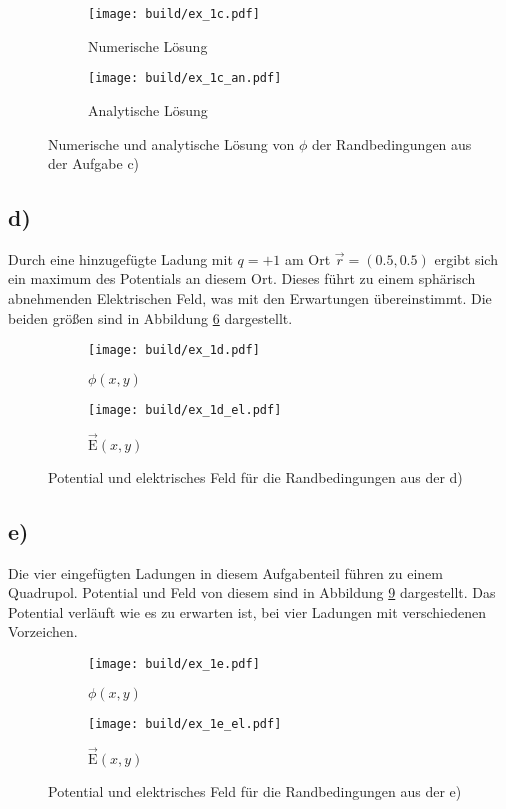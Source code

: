 \begin{figure}
    \begin{subfigure}{0.48\textwidth}
        \centering
        \texttt{[image: build/ex\_1c.pdf]}
        \caption{Numerische Lösung}
        \label{fig:1c}
    \end{subfigure}
    \hfill
    \begin{subfigure}{0.48\textwidth}
        \centering
        \texttt{[image: build/ex\_1c\_an.pdf]}
        \caption{Analytische Lösung}
        \label{fig:1ce}
    \end{subfigure}
    \caption{Numerische und analytische Lösung von $\phi$ der Randbedingungen aus der Aufgabe c)}
    \label{fig:1cg}
\end{figure}



\FloatBarrier
\subsection*{d)}
Durch eine hinzugefügte Ladung mit $q = +1$ am Ort $\vec{r} = (0.5, 0.5)$ ergibt sich ein maximum des Potentials an diesem Ort.
Dieses führt zu einem sphärisch abnehmenden Elektrischen Feld, was mit den Erwartungen übereinstimmt. Die beiden größen sind in Abbildung \ref{fig:1dg} dargestellt.
\begin{figure}
    \begin{subfigure}{0.48\textwidth}
        \centering
        \texttt{[image: build/ex\_1d.pdf]}
        \caption{$\phi(x,y)$}
        \label{fig:1d}
    \end{subfigure}
    \hfill
    \begin{subfigure}{0.48\textwidth}
        \centering
        \texttt{[image: build/ex\_1d\_el.pdf]}
        \caption{$\vec{\text{E}}(x,y)$}
        \label{fig:1de}
    \end{subfigure}
    \caption{Potential und elektrisches Feld für die Randbedingungen aus der d)}
    \label{fig:1dg}
\end{figure}
\FloatBarrier
\subsection*{e)}
Die vier eingefügten Ladungen in diesem Aufgabenteil führen zu einem Quadrupol. 
Potential und Feld von diesem sind in Abbildung \ref{fig:1eg} dargestellt.
Das Potential verläuft wie es zu erwarten ist, bei vier Ladungen mit verschiedenen Vorzeichen.

\begin{figure}
    \begin{subfigure}{0.48\textwidth}
        \centering
        \texttt{[image: build/ex\_1e.pdf]}
        \caption{$\phi(x,y)$}
        \label{fig:1e}
    \end{subfigure}
    \hfill
    \begin{subfigure}{0.48\textwidth}
        \centering
        \texttt{[image: build/ex\_1e\_el.pdf]}
        \caption{$\vec{\text{E}}(x,y)$}
        \label{fig:1ee}
    \end{subfigure}
    \caption{Potential und elektrisches Feld für die Randbedingungen aus der e)}
    \label{fig:1eg}
\end{figure}